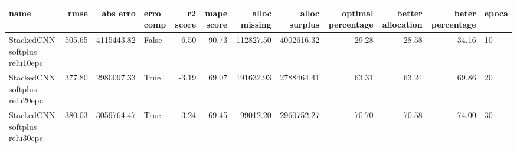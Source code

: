 \begin{tabular}{lrrlrrrrrrrl}
\toprule
name & rmse & abs erro & erro comp & r2 score & mape score & alloc missing & alloc surplus & optimal percentage & better allocation & beter percentage & epoca \\
\midrule
StackedCNN softplus relu10epc & 505.65 & 4115443.82 & False & -6.50 & 90.73 & 112827.50 & 4002616.32 & 29.28 & 28.58 & 34.16 & 10 \\
StackedCNN softplus relu20epc & 377.80 & 2980097.33 & True & -3.19 & 69.07 & 191632.93 & 2788464.41 & 63.31 & 63.24 & 69.86 & 20 \\
StackedCNN softplus relu30epc & 380.03 & 3059764.47 & True & -3.24 & 69.45 & 99012.20 & 2960752.27 & 70.70 & 70.58 & 74.00 & 30 \\
\bottomrule
\end{tabular}
